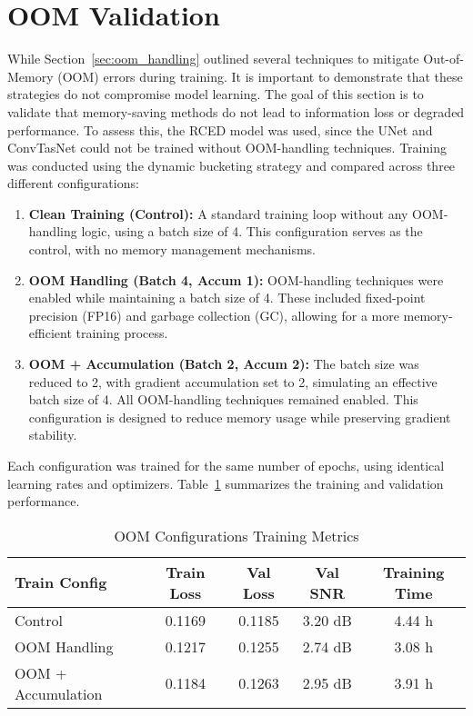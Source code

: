 \section{OOM Validation}
\label{sec:oom_validation}

While Section~\ref{sec:oom_handling} outlined several techniques to mitigate Out-of-Memory (OOM) errors during training. It is important to demonstrate that these strategies do not compromise model learning. The goal of this section is to validate that memory-saving methods do not lead to information loss or degraded performance. To assess this, the RCED model was used, since the UNet and ConvTasNet could not be trained without OOM-handling techniques. Training was conducted using the dynamic bucketing strategy and compared across three different configurations:

\begin{enumerate}
    \item \textbf{Clean Training (Control):} A standard training loop without any OOM-handling logic, using a batch size of 4. This configuration serves as the control, with no memory management mechanisms.
    
    \item \textbf{OOM Handling (Batch 4, Accum 1):} OOM-handling techniques were enabled while maintaining a batch size of 4. These included fixed-point precision (FP16) and garbage collection (GC), allowing for a more memory-efficient training process.
    
    \item \textbf{OOM + Accumulation (Batch 2, Accum 2):} The batch size was reduced to 2, with gradient accumulation set to 2, simulating an effective batch size of 4. All OOM-handling techniques remained enabled. This configuration is designed to reduce memory usage while preserving gradient stability.
\end{enumerate}

Each configuration was trained for the same number of epochs, using identical learning rates and optimizers. Table~\ref{tab:oom_training} summarizes the training and validation performance.

\vspace{1em}
\begin{table}[H]
\centering
\caption{OOM Configurations Training Metrics}
\label{tab:oom_training}
\begin{tabular}{|l|c|c|c|c|}
\hline
\textbf{Train Config} & \textbf{Train Loss} & \textbf{Val Loss} & \textbf{Val SNR} & \textbf{Training Time} \\
\hline
Control                & 0.1169 & 0.1185 & 3.20 dB & 4.44 h \\
OOM Handling           & 0.1217 & 0.1255 & 2.74 dB & 3.08 h \\
OOM + Accumulation     & 0.1184 & 0.1263 & 2.95 dB & 3.91 h \\
\hline
\end{tabular}
\end{table}

